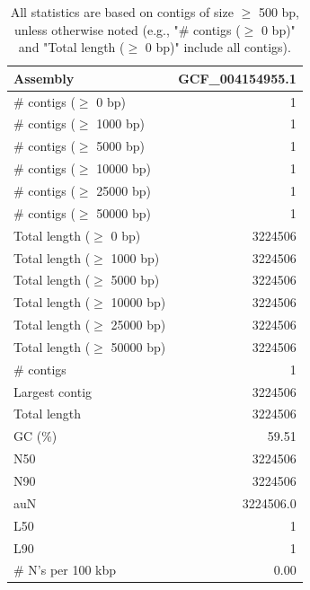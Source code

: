 \documentclass[12pt,a4paper]{article}
\begin{document}
\begin{table}[ht]
\begin{center}
\caption{All statistics are based on contigs of size $\geq$ 500 bp, unless otherwise noted (e.g., "\# contigs ($\geq$ 0 bp)" and "Total length ($\geq$ 0 bp)" include all contigs).}
\begin{tabular}{|l*{1}{|r}|}
\hline
Assembly & GCF\_004154955.1 \\ \hline
\# contigs ($\geq$ 0 bp) & 1 \\ \hline
\# contigs ($\geq$ 1000 bp) & 1 \\ \hline
\# contigs ($\geq$ 5000 bp) & 1 \\ \hline
\# contigs ($\geq$ 10000 bp) & 1 \\ \hline
\# contigs ($\geq$ 25000 bp) & 1 \\ \hline
\# contigs ($\geq$ 50000 bp) & 1 \\ \hline
Total length ($\geq$ 0 bp) & 3224506 \\ \hline
Total length ($\geq$ 1000 bp) & 3224506 \\ \hline
Total length ($\geq$ 5000 bp) & 3224506 \\ \hline
Total length ($\geq$ 10000 bp) & 3224506 \\ \hline
Total length ($\geq$ 25000 bp) & 3224506 \\ \hline
Total length ($\geq$ 50000 bp) & 3224506 \\ \hline
\# contigs & 1 \\ \hline
Largest contig & 3224506 \\ \hline
Total length & 3224506 \\ \hline
GC (\%) & 59.51 \\ \hline
N50 & 3224506 \\ \hline
N90 & 3224506 \\ \hline
auN & 3224506.0 \\ \hline
L50 & 1 \\ \hline
L90 & 1 \\ \hline
\# N's per 100 kbp & 0.00 \\ \hline
\end{tabular}
\end{center}
\end{table}
\end{document}
